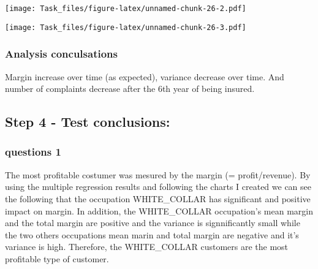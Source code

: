 \documentclass[]{article}
\newenvironment{Shaded}{\begin{snugshade}}{\end{snugshade}}
\newcommand{\KeywordTok}[1]{\textcolor[rgb]{0.13,0.29,0.53}{\textbf{#1}}}
\newcommand{\DataTypeTok}[1]{\textcolor[rgb]{0.13,0.29,0.53}{#1}}
\newcommand{\StringTok}[1]{\textcolor[rgb]{0.31,0.60,0.02}{#1}}
\newcommand{\OperatorTok}[1]{\textcolor[rgb]{0.81,0.36,0.00}{\textbf{#1}}}
\newcommand{\NormalTok}[1]{#1}
\begin{document}
\texttt{[image: Task\_files/figure-latex/unnamed-chunk-26-2.pdf]}

\begin{Shaded}
\end{Shaded}

\texttt{[image: Task\_files/figure-latex/unnamed-chunk-26-3.pdf]}

\subsubsection{Analysis conculsations}\label{analysis-conculsations-3}

Margin increase over time (as expected), variance decrease over time.
And number of complaints decrease after the 6th year of being insured.

\subsection{Step 4 - Test conclusions:}\label{step-4---test-conclusions}

\subsubsection{questions 1}\label{questions-1}

The most profitable costumer was mesured by the margin (=
profit/revenue). By using the multiple regression results and following
the charts I created we can see the following that the occupation
WHITE\_COLLAR has significant and positive impact on margin. In
addition, the WHITE\_COLLAR occupation's mean margin and the total
margin are positive and the variance is signnificantly small while the
two others occupations mean marin and total margin are negative and it's
variance is high. Therefore, the WHITE\_COLLAR customers are the most
profitable type of customer.
\end{document}
